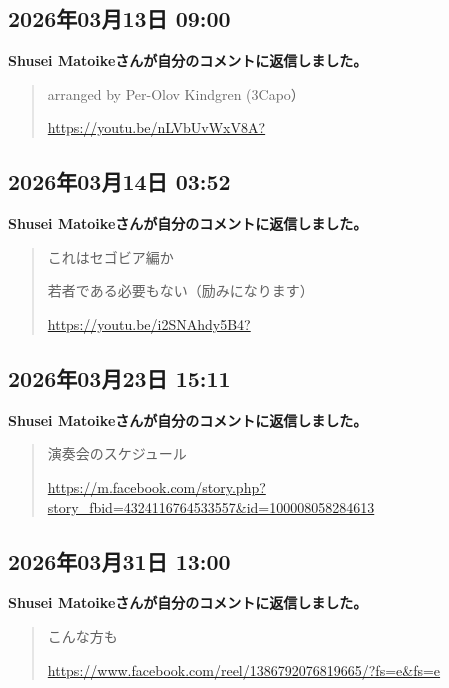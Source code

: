 \subsection*{2026年03月13日 09:00}

\textbf{Shusei Matoikeさんが自分のコメントに返信しました。}

\begin{quote}
arranged by Per-Olov Kindgren (3Capo）

\url{https://youtu.be/nLVbUvWxV8A?}
\end{quote}

\subsection*{2026年03月14日 03:52}

\textbf{Shusei Matoikeさんが自分のコメントに返信しました。}

\begin{quote}
これはセゴビア編か

若者である必要もない（励みになります）

\url{https://youtu.be/i2SNAhdy5B4?}
\end{quote}

\subsection*{2026年03月23日 15:11}

\textbf{Shusei Matoikeさんが自分のコメントに返信しました。}

\begin{quote}
演奏会のスケジュール

\url{https://m.facebook.com/story.php?story_fbid=4324116764533557&id=100008058284613}
\end{quote}

\subsection*{2026年03月31日 13:00}

\textbf{Shusei Matoikeさんが自分のコメントに返信しました。}

\begin{quote}
こんな方も

\url{https://www.facebook.com/reel/1386792076819665/?fs=e&fs=e}
\end{quote}

